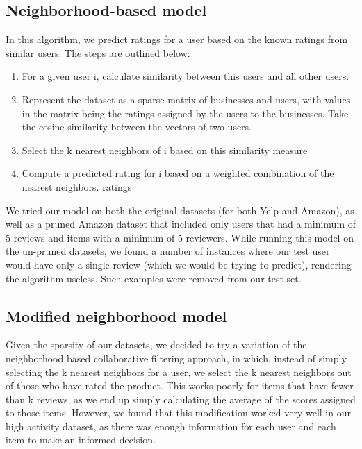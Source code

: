 \documentclass[letterpaper, 10 pt, twocolumn]{article}
\begin{document}
\subsection{Neighborhood-based model}

In this algorithm, we predict ratings for a user based on the known
ratings from similar users. The steps are outlined below:

\begin{enumerate}
  \item For a given user i, calculate similarity between this users and all
    other users. 
  \item Represent the dataset as a sparse matrix of businesses and users, with
    values in the matrix being the ratings assigned by the users to the
    businesses. Take the cosine similarity between the vectors of two users.
  \item Select the k nearest neighbors of i based on this similarity measure
  \item Compute a predicted rating for i based on a weighted combination of the
    nearest neighbors. ratings
\end{enumerate}

We tried our model on both the original datasets (for both Yelp and
Amazon), as well as a pruned Amazon dataset that included only users that
had a minimum of 5 reviews and items with a minimum of 5 reviewers. While
running this model on the un-pruned datasets, we found a number of
instances where our test user would have only a single review (which we
would be trying to predict), rendering the algorithm useless. Such
examples were removed from our test set. 

\subsection{Modified neighborhood model}

Given the sparsity of our datasets, we decided to try a variation of the
neighborhood based collaborative filtering approach, in which, instead of
simply selecting the k nearest neighbors for a user, we select the k
nearest neighbors out of those who have rated the product. This works
poorly for items that have fewer than k reviews, as we end up simply
calculating the average of the scores assigned to those items. However, we
found that this modification worked very well in our high activity
dataset, as there was enough information for each user and each item to
make an informed decision. 
\end{document}
